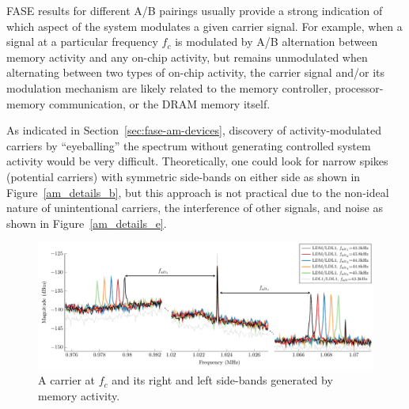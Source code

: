 FASE results for different A/B pairings usually provide a strong indication of which aspect of the system modulates a given carrier signal. For example, when a signal at a particular frequency $f_c$ is modulated by A/B alternation between memory activity and any on-chip activity, but remains unmodulated when alternating between two types of on-chip activity, the carrier signal and/or its modulation mechanism are likely related to the memory controller, processor-memory communication, or the DRAM memory itself.

As indicated in Section~\ref{sec:fase-am-devices}, discovery of activity-modulated carriers by ``eyeballing'' the spectrum without generating controlled system activity would be very difficult. Theoretically, one could look for narrow spikes (potential carriers) with symmetric side-bands on either side as shown in Figure~\ref{am_details_b}, but this approach is not practical due to the non-ideal nature of unintentional carriers, the interference of other signals, and noise as shown in Figure~\ref{am_details_e}.

\begin{figure}[tb]
  \centering
    \includegraphics[width=\textwidth]{../fase/Data/mem_refresh_zoom.pdf}
  \caption{A carrier at $f_c$ and its right and left side-bands generated by memory activity.}
  \label{mem_refresh_zoom}
\end{figure}


